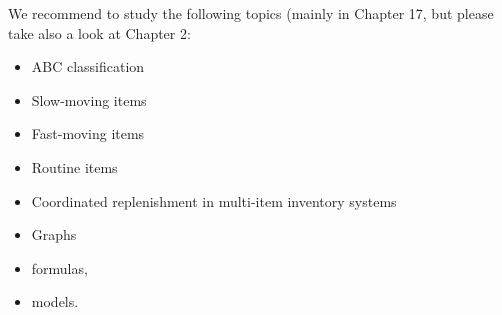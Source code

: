 
We recommend to study the following topics (mainly in Chapter 17, but please take also a look at Chapter 2:

\begin{itemize}
\item ABC classification
\item Slow-moving items
\item Fast-moving items
\item Routine items
\item Coordinated replenishment in multi-item inventory systems
\end{itemize}

\begin{itemize}
\item Graphs
\item formulas,
\item models.
\end{itemize}


